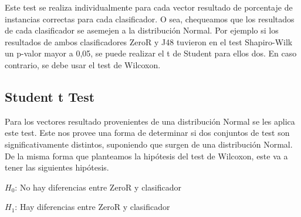 Este test se realiza individualmente para cada vector resultado de porcentaje de instancias correctas para cada clasificador. O sea, chequeamos que los resultados de cada clasificador se asemejen a la distribución Normal. Por ejemplo si los resultados de ambos clasificadores ZeroR y J48 tuvieron en el test Shapiro-Wilk un p-valor mayor a 0,05, se puede realizar el t de Student para ellos dos. En caso contrario, se debe usar el test de Wilcoxon.

\subsection{Student t Test}



Para los vectores resultado provenientes de una distribución Normal se les aplica este test. Este nos provee una forma de determinar si dos conjuntos de test son significativamente distintos, suponiendo que surgen de una distribución Normal. De la misma forma que planteamos la hipótesis del test de Wilcoxon, este va a tener las siguientes hipótesis. 

\vspace{0.5cm}
\hspace{2cm}$H_0$: No hay diferencias entre ZeroR y clasificador
\vspace{0.25cm}

\hspace{2cm}$H_1$: Hay diferencias entre ZeroR y clasificador
\vspace{0.5cm}

